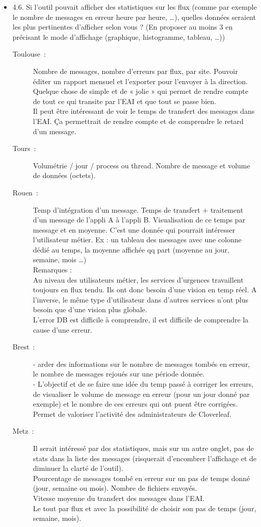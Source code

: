 \begin{itemize}
	  \item 4.6. Si l’outil pouvait afficher des statistiques sur les flux (comme
	  par exemple le nombre de messages en erreur heure par heure, …), quelles
	  données seraient les plus pertinentes d’afficher selon vous ? (En proposer au
	  moins 3 en précisant le mode d’affichage (graphique, histogramme, tableau,
	  …))
	  \begin{description}
	  	\item[Toulouse~:] Nombre de messages, nombre d’erreurs par flux, par site.
	  	Pouvoir éditer un rapport mensuel et l’exporter pour l’envoyer à la
	  	direction. Quelque chose de simple et de « jolie » qui permet de rendre
	  	compte de tout ce qui transite par l’EAI et que tout se passe bien.\\
		Il peut être intéressant de voir le temps de transfert des messages dans l’EAI.
		Ça permettrait de rendre compte et de comprendre le retard d’un message.
	  	\item[Tours~:] Volumétrie / jour / process ou thread. Nombre de message et
	  	volume de données (octets).
	  	\item[Rouen~:] Temp d’intégration d’un message. Temps de transfert +
	  	traitement d’un message de l’appli A à l’appli B. Visualisation de ce temps
	  	par message et en moyenne. C’est une donnée qui pourrait intéresser
	  	l’utilisateur métier. Ex : un tableau des messages avec une colonne dédié
	  	au temps, la moyenne affichée qq part (moyenne au jour, semaine, mois …)\\
	  	Remarques :\\
		Au niveau des utilisateurs métier, les services d’urgences travaillent toujours
		en flux tendu. Ils ont donc besoin d’une vision en temp réel. A l’inverse, le
		même type d’utilisateur dans d’autres services n’ont plus besoin que d’une
		vision plus globale.\\
		L’error DB est difficile à comprendre, il est difficile de comprendre la cause
		d’une erreur.
	  	\item[Brest~:] - arder des informations sur le nombre de messages tombés en
	  	erreur, le nombre de messages rejoués sur une période donnée.\\
		- L’objectif et de se faire une idée du temp passé à corriger les erreurs, de
		visualiser le volume de message en erreur (pour un jour donné par exemple) et
		le nombre de ces erreurs qui ont puent être corrigées. Permet de valoriser
		l’activité des administrateurs de Cloverleaf.
	  	\item[Metz~:] Il serait intéressé par des statistiques, mais sur un autre
	  	onglet, pas de stats dans la liste des messages (risquerait d’encombrer
	  	l’affichage et de diminuer la clarté de l’outil).\\
		Pourcentage de messages tombé en erreur sur un pas de temps donné (jour,
		semaine ou mois). Nombre de fichiers envoyés.\\
		Vitesse moyenne du transfert des messages dans l’EAI.\\
		Le tout par flux et avec la possibilité de choisir son pas de temps (jour,
		semaine, mois).
	  \end{description}
	  

\end{itemize}
